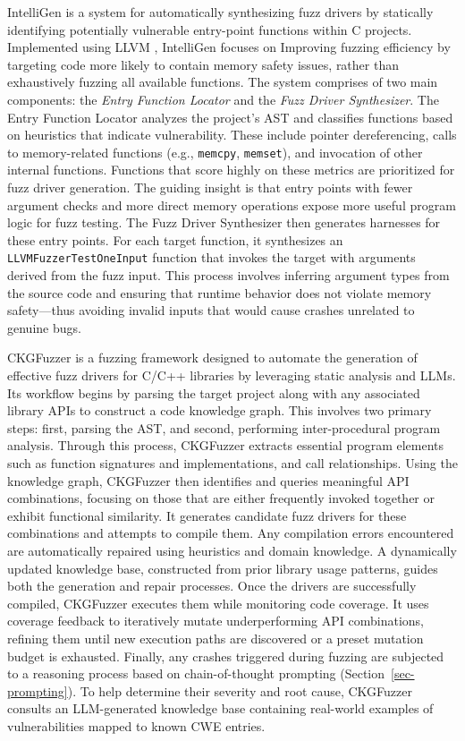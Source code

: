 \documentclass[
  a4paper,
]{scrreprt}
\theoremstyle{definition}
\theoremstyle{remark}
\begin{document}
IntelliGen \autocite{zhang2021} is a system for automatically
synthesizing fuzz drivers by statically identifying potentially
vulnerable entry-point functions within C projects. Implemented using
LLVM \autocite{llvm}, IntelliGen focuses on Improving fuzzing efficiency
by targeting code more likely to contain memory safety issues, rather
than exhaustively fuzzing all available functions. The system comprises
of two main components: the \emph{Entry Function Locator} and the
\emph{Fuzz Driver Synthesizer}. The Entry Function Locator analyzes the
project's AST and classifies functions based on heuristics that indicate
vulnerability. These include pointer dereferencing, calls to
memory-related functions (e.g., \texttt{memcpy}, \texttt{memset}), and
invocation of other internal functions. Functions that score highly on
these metrics are prioritized for fuzz driver generation. The guiding
insight is that entry points with fewer argument checks and more direct
memory operations expose more useful program logic for fuzz testing. The
Fuzz Driver Synthesizer then generates harnesses for these entry points.
For each target function, it synthesizes an
\texttt{LLVMFuzzerTestOneInput} function that invokes the target with
arguments derived from the fuzz input. This process involves inferring
argument types from the source code and ensuring that runtime behavior
does not violate memory safety---thus avoiding invalid inputs that would
cause crashes unrelated to genuine bugs.

CKGFuzzer \autocite{xu2024} is a fuzzing framework designed to automate
the generation of effective fuzz drivers for C/C++ libraries by
leveraging static analysis and LLMs. Its workflow begins by parsing the
target project along with any associated library APIs to construct a
code knowledge graph. This involves two primary steps: first, parsing
the AST, and second, performing inter-procedural program analysis.
Through this process, CKGFuzzer extracts essential program elements such
as function signatures and implementations, and call relationships.
Using the knowledge graph, CKGFuzzer then identifies and queries
meaningful API combinations, focusing on those that are either
frequently invoked together or exhibit functional similarity. It
generates candidate fuzz drivers for these combinations and attempts to
compile them. Any compilation errors encountered are automatically
repaired using heuristics and domain knowledge. A dynamically updated
knowledge base, constructed from prior library usage patterns, guides
both the generation and repair processes. Once the drivers are
successfully compiled, CKGFuzzer executes them while monitoring code
coverage. It uses coverage feedback to iteratively mutate
underperforming API combinations, refining them until new execution
paths are discovered or a preset mutation budget is exhausted. Finally,
any crashes triggered during fuzzing are subjected to a reasoning
process based on chain-of-thought prompting \autocite{chainofthought}
(Section~\ref{sec-prompting}). To help determine their severity and root
cause, CKGFuzzer consults an LLM-generated knowledge base containing
real-world examples of vulnerabilities mapped to known CWE entries.
\end{document}
